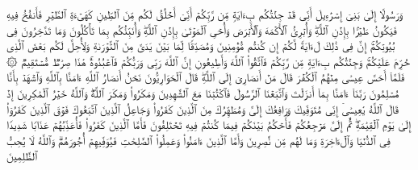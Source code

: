 \stopbuffer
\startbuffer[\q:3:49]
وَرَسُولًا إِلَىٰ بَنِیۤ إِسۡرَٰۤءِیلَ أَنِّی قَدۡ جِئۡتُكُم بِءَایَةࣲ مِّن رَّبِّكُمۡ أَنِّیۤ أَخۡلُقُ لَكُم مِّنَ ٱلطِّینِ كَهَیۡءَةِ ٱلطَّیۡرِ فَأَنفُخُ فِیهِ فَیَكُونُ طَیۡرَۢا بِإِذۡنِ ٱللَّهِۖ وَأُبۡرِئُ ٱلۡأَكۡمَهَ وَٱلۡأَبۡرَصَ وَأُحۡیِ ٱلۡمَوۡتَىٰ بِإِذۡنِ ٱللَّهِۖ وَأُنَبِّئُكُم بِمَا تَأۡكُلُونَ وَمَا تَدَّخِرُونَ فِی بُیُوتِكُمۡۚ إِنَّ فِی ذَٰلِكَ لَءَایَةࣰ لَّكُمۡ إِن كُنتُم مُّؤۡمِنِینَ%
\stopbuffer
\startbuffer[\q:3:50]
وَمُصَدِّقࣰا لِّمَا بَیۡنَ یَدَیَّ مِنَ ٱلتَّوۡرَىٰةِ وَلِأُحِلَّ لَكُم بَعۡضَ ٱلَّذِی حُرِّمَ عَلَیۡكُمۡۚ وَجِئۡتُكُم بِءَایَةࣲ مِّن رَّبِّكُمۡ فَٱتَّقُوا۟ ٱللَّهَ وَأَطِیعُونِ%
\stopbuffer
\startbuffer[\q:3:51]
إِنَّ ٱللَّهَ رَبِّی وَرَبُّكُمۡ فَٱعۡبُدُوهُۚ هَٰذَا صِرَٰطࣱ مُّسۡتَقِیمࣱ%
\stopbuffer
\startbuffer[\q:3:52]
۞ فَلَمَّاۤ أَحَسَّ عِیسَىٰ مِنۡهُمُ ٱلۡكُفۡرَ قَالَ مَنۡ أَنصَارِیۤ إِلَى ٱللَّهِۖ قَالَ ٱلۡحَوَارِیُّونَ نَحۡنُ أَنصَارُ ٱللَّهِ ءَامَنَّا بِٱللَّهِ وَٱشۡهَدۡ بِأَنَّا مُسۡلِمُونَ%
\stopbuffer
\startbuffer[\q:3:53]
رَبَّنَاۤ ءَامَنَّا بِمَاۤ أَنزَلۡتَ وَٱتَّبَعۡنَا ٱلرَّسُولَ فَٱكۡتُبۡنَا مَعَ ٱلشَّٰهِدِینَ%
\stopbuffer
\startbuffer[\q:3:54]
وَمَكَرُوا۟ وَمَكَرَ ٱللَّهُۖ وَٱللَّهُ خَیۡرُ ٱلۡمَٰكِرِینَ%
\stopbuffer
\startbuffer[\q:3:55]
إِذۡ قَالَ ٱللَّهُ یَٰعِیسَىٰۤ إِنِّی مُتَوَفِّیكَ وَرَافِعُكَ إِلَیَّ وَمُطَهِّرُكَ مِنَ ٱلَّذِینَ كَفَرُوا۟ وَجَاعِلُ ٱلَّذِینَ ٱتَّبَعُوكَ فَوۡقَ ٱلَّذِینَ كَفَرُوۤا۟ إِلَىٰ یَوۡمِ ٱلۡقِیَٰمَةِۖ ثُمَّ إِلَیَّ مَرۡجِعُكُمۡ فَأَحۡكُمُ بَیۡنَكُمۡ فِیمَا كُنتُمۡ فِیهِ تَخۡتَلِفُونَ%
\stopbuffer
\startbuffer[\q:3:56]
فَأَمَّا ٱلَّذِینَ كَفَرُوا۟ فَأُعَذِّبُهُمۡ عَذَابࣰا شَدِیدࣰا فِی ٱلدُّنۡیَا وَٱلۡءَاخِرَةِ وَمَا لَهُم مِّن نَّٰصِرِینَ%
\stopbuffer
\startbuffer[\q:3:57]
وَأَمَّا ٱلَّذِینَ ءَامَنُوا۟ وَعَمِلُوا۟ ٱلصَّٰلِحَٰتِ فَیُوَفِّیهِمۡ أُجُورَهُمۡۗ وَٱللَّهُ لَا یُحِبُّ ٱلظَّٰلِمِینَ%
\stopbuffer
